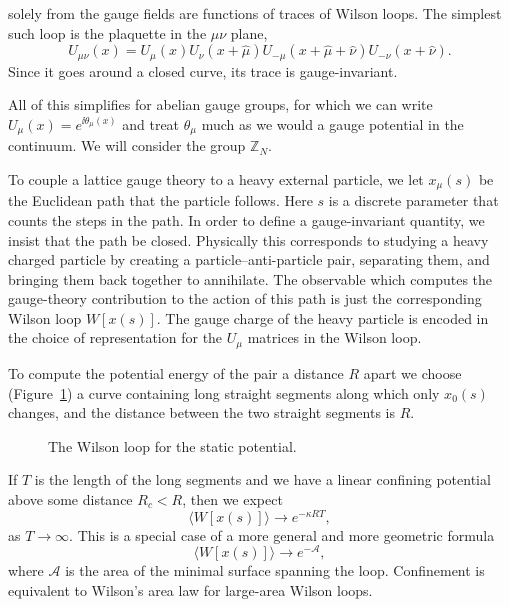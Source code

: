 solely from the gauge fields are functions of traces of Wilson loops. The
simplest such loop is the plaquette in the $\mu\nu$ plane,
\begin{equation*}
  U_{\mu\nu}(x)=U_\mu(x)U_\nu(x+\hat\mu)U_{-\mu}(x+\hat\mu+\hat\nu)
  U_{-\nu}(x+\hat\nu).
\end{equation*}
Since it goes around a closed curve, its trace is gauge-invariant.

All of this simplifies for abelian gauge groups, for which we can write
$U_\mu(x)=e^{\ii\theta_\mu(x)}$ and treat $\theta_\mu$ much as we would a gauge
potential in the continuum. We will consider the group $\mathbb Z_N$.

To couple a lattice gauge theory to a heavy external particle, we let $x_\mu(s)$
be the Euclidean path that the particle follows. Here $s$ is a discrete
parameter that counts the steps in the path. In order to define a gauge-invariant
quantity, we insist that the path be closed. Physically this corresponds to
studying a heavy charged particle by creating a particle--anti-particle pair,
separating them, and bringing them back together to annihilate. The observable
which computes the gauge-theory contribution to the action of this path is just
the corresponding Wilson loop $W[x(s)]$. The gauge charge of the heavy particle
is encoded in the choice of representation for the $U_\mu$ matrices in the
Wilson loop.

To compute the potential energy of the pair a distance $R$ apart we choose
(Figure~\ref{fig:8.3}) a curve containing long straight segments along which
only $x_0(s)$ changes, and the distance between the two straight segments is
$R$.
\begin{figure}[htbp]
  \centering
  
  \caption{The Wilson loop for the static potential.}
  \label{fig:8.3}
\end{figure}
If $T$ is the length of the long segments and we have a linear confining
potential above some distance $R_c<R$, then we expect
\begin{equation*}
  \langle W[x(s)]\rangle\longrightarrow e^{-\kappa RT},
\end{equation*}
as $T\to\infty$. This is a special case of a more general and more geometric
formula
\begin{equation*}
  \langle W[x(s)]\rangle\longrightarrow e^{-\mathcal A},
\end{equation*}
where $\mathcal A$ is the area of the minimal surface spanning the loop.
Confinement is equivalent to Wilson's area law for large-area Wilson loops.

